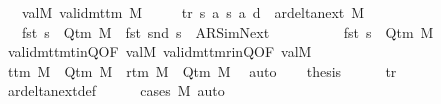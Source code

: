 \begin{isabellebody}
\ \ \ valM{\isacharcolon}{\kern0pt}\ {\isachardoublequoteopen}valid{\isacharunderscore}{\kern0pt}mttm\ M{\isachardoublequoteclose}\isanewline
\ \ \ \ \ tr{\isacharcolon}{\kern0pt}\ {\isachardoublequoteopen}{\isacharparenleft}{\kern0pt}s{\isacharcomma}{\kern0pt}\ a{\isacharcomma}{\kern0pt}\ s{\isacharprime}{\kern0pt}{\isacharcomma}{\kern0pt}\ a{\isacharprime}{\kern0pt}{\isacharcomma}{\kern0pt}\ d{\isacharparenright}{\kern0pt}\ {\isasymin}\ ar{\isacharunderscore}{\kern0pt}delta{\isacharunderscore}{\kern0pt}next\ M{\isachardoublequoteclose}\isanewline
\ \ \ {\isachardoublequoteopen}fst\ s\ {\isasymin}\ Q{\isacharunderscore}{\kern0pt}tm\ M\ {\isasymand}\ fst\ {\isacharparenleft}{\kern0pt}snd\ s{\isacharparenright}{\kern0pt}\ {\isacharequal}{\kern0pt}\ AR{\isacharunderscore}{\kern0pt}SimNext\isanewline
\ \ \ \ \ \ \ \ \ {\isasymand}\ fst\ s{\isacharprime}{\kern0pt}\ {\isasymin}\ Q{\isacharunderscore}{\kern0pt}tm\ M{\isachardoublequoteclose}\isanewline
%
\isadelimproof
%
\endisadelimproof
%
\isatagproof
{}\isamarkupfalse%
\ {\isacharminus}{\kern0pt}\isanewline
\ \ \isamarkupfalse%
\ valid{\isacharunderscore}{\kern0pt}mttm{\isacharunderscore}{\kern0pt}t{\isacharunderscore}{\kern0pt}in{\isacharunderscore}{\kern0pt}Q{\isacharbrackleft}{\kern0pt}OF\ valM{\isacharbrackright}{\kern0pt}\ valid{\isacharunderscore}{\kern0pt}mttm{\isacharunderscore}{\kern0pt}r{\isacharunderscore}{\kern0pt}in{\isacharunderscore}{\kern0pt}Q{\isacharbrackleft}{\kern0pt}OF\ valM{\isacharbrackright}{\kern0pt}\isanewline
\ \ \isamarkupfalse%
\ {\isachardoublequoteopen}t{\isacharunderscore}{\kern0pt}tm\ M\ {\isasymin}\ Q{\isacharunderscore}{\kern0pt}tm\ M{\isachardoublequoteclose}\ \ {\isachardoublequoteopen}r{\isacharunderscore}{\kern0pt}tm\ M\ {\isasymin}\ Q{\isacharunderscore}{\kern0pt}tm\ M{\isachardoublequoteclose}\ \isamarkupfalse%
\ auto\isanewline
\ \ \isamarkupfalse%
\ {\isacharquery}{\kern0pt}thesis\isanewline
\ \ \ \ \isamarkupfalse%
\ tr\isanewline
\ \ \ \ \isamarkupfalse%
\ ar{\isacharunderscore}{\kern0pt}delta{\isacharunderscore}{\kern0pt}next{\isacharunderscore}{\kern0pt}def\isanewline
\ \ \ \ \isamarkupfalse%
\ {\isacharparenleft}{\kern0pt}cases\ M{\isacharparenright}{\kern0pt}\ auto\isanewline
{}\isamarkupfalse%
%
\endisatagproof
{\isafoldproof}%
%
\isadelimproof
%
\endisadelimproof
%
\begin{isamarkuptext}%

\end{isamarkuptext}
\end{isabellebody}
